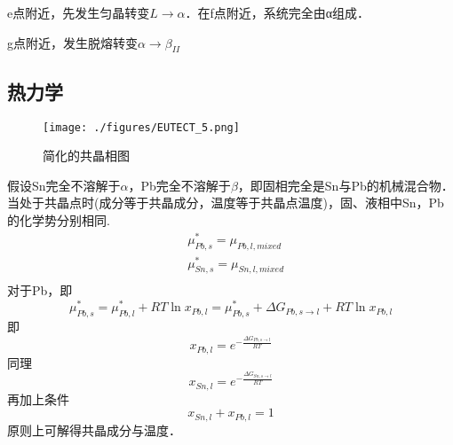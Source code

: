 e点附近，先发生匀晶转变$L \rightarrow \alpha$．在f点附近，系统完全由α组成．

g点附近，发生脱熔转变$\alpha \rightarrow \beta_{II}$

\subsection{热力学}
\begin{figure}[ht]
\centering
\texttt{[image: ./figures/EUTECT\_5.png]}
\caption{简化的共晶相图} \label{EUTECT_fig5}
\end{figure}
假设Sn完全不溶解于$\alpha$，Pb完全不溶解于$\beta$，即固相完全是Sn与Pb的机械混合物．当处于共晶点时(成分等于共晶成分，温度等于共晶点温度)，固、液相中Sn，Pb的化学势分别相同.
\begin{align}
&\mu_{Pb,s}^*=\mu_{Pb,l,mixed}\\
&\mu_{Sn,s}^*=\mu_{Sn,l,mixed}\\
\end{align}
对于Pb，即
$$\mu_{Pb,s}^*=\mu_{Pb,l}^*+RT \ln x_{Pb,l}=\mu_{Pb,s}^*+\Delta G_{Pb, s\rightarrow l}+RT \ln x_{Pb,l}$$
即
\begin{equation}
x_{Pb,l}=e^{-\frac{\Delta G_{Pb, s\rightarrow l}}{RT}}
\end{equation}
同理
\begin{equation}
x_{Sn,l}=e^{-\frac{\Delta G_{Sn, s\rightarrow l}}{RT}}
\end{equation}
再加上条件
\begin{equation}
x_{Sn,l}+x_{Pb,l}=1
\end{equation}
原则上可解得共晶成分与温度．
